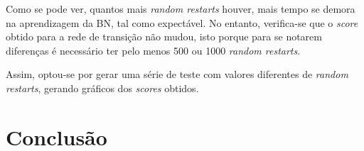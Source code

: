 \documentclass[10pt]{article}
\numberwithin{equation}{section}
\begin{document}
Como se pode ver, quantos mais \textit{random restarts} houver, mais tempo se demora na aprendizagem da BN, tal como expectável. No entanto, verifica-se que o \textit{score} obtido para a rede de transição não mudou, isto porque para se notarem diferenças é necessário ter pelo menos 500 ou 1000 \textit{random restarts}.

Assim, optou-se por gerar uma série de teste com valores diferentes de \textit{random restarts}, gerando gráficos dos \textit{scores} obtidos.



\section{Conclusão}
\end{document}
